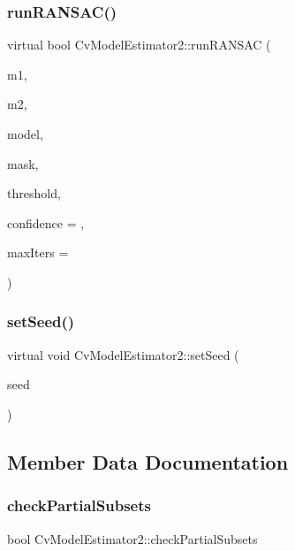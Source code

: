 \subsubsection{run\+R\+A\+N\+S\+A\+C()}
{\footnotesize\ttfamily virtual bool Cv\+Model\+Estimator2\+::run\+R\+A\+N\+S\+AC (\begin{DoxyParamCaption}\item[{const Cv\+Mat $\ast$}]{m1,  }\item[{const Cv\+Mat $\ast$}]{m2,  }\item[{Cv\+Mat $\ast$}]{model,  }\item[{Cv\+Mat $\ast$}]{mask,  }\item[{double}]{threshold,  }\item[{double}]{confidence = {},  }\item[{int}]{max\+Iters = {} }\end{DoxyParamCaption})\hspace{0.3cm}{\ttfamily [virtual]}}

\mbox{\label{class_cv_model_estimator2_a4946fc6c99f37e5dae1f68e78e85110d}} 
\subsubsection{set\+Seed()}
{\footnotesize\ttfamily virtual void Cv\+Model\+Estimator2\+::set\+Seed (\begin{DoxyParamCaption}\item[{int64}]{seed }\end{DoxyParamCaption})\hspace{0.3cm}{\ttfamily [virtual]}}



\subsection{Member Data Documentation}
\mbox{\label{class_cv_model_estimator2_a579cf07784af6c3710ab23aa841cb7d5}} 
\subsubsection{check\+Partial\+Subsets}
{\footnotesize\ttfamily bool Cv\+Model\+Estimator2\+::check\+Partial\+Subsets\hspace{0.3cm}{\ttfamily [protected]}}


